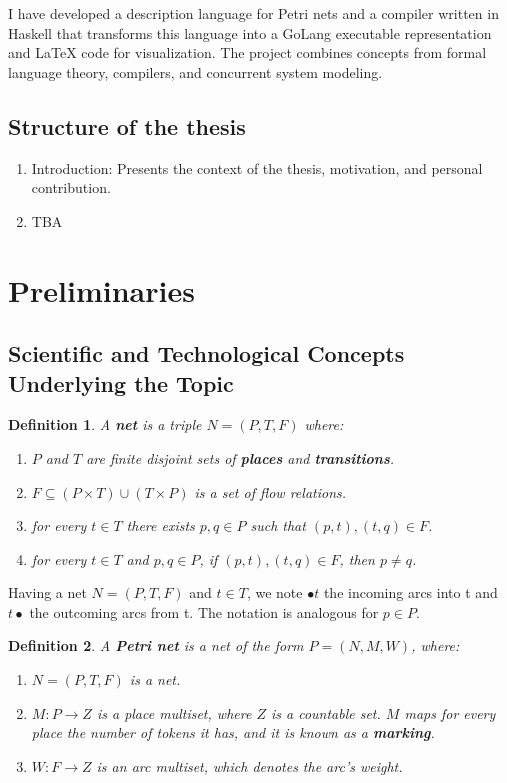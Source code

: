 \documentclass[12pt]{article}
\newtheorem{definition}{Definition}
\begin{document}
    I have developed a description language for Petri nets and a compiler written in Haskell 
    that transforms this language into a GoLang executable representation and LaTeX code for visualization. 
    The project combines concepts from formal language theory, compilers, 
    and concurrent system modeling.

    \subsection{Structure of the thesis}
    \begin{enumerate}
        \item Introduction: Presents the context of the thesis, motivation, and personal contribution.
        \item TBA
    \end{enumerate}
\section{Preliminaries}
    \subsection{Scientific and Technological Concepts Underlying the Topic}
    \begin{definition}
        A \textbf{net} is a triple \(N=(P,T,F)\) where:
        \begin{enumerate}
            \item \(P\) and \(T\) are finite disjoint sets of \textbf{places} and \textbf{transitions}.
            \item \(F \subseteq (P \times T)\cup(T \times P)\) is a set of flow relations.
            \item for every \(t \in T\) there exists $p,q \in P$ such that $(p,t),(t,q) \in F$.
            \item for every $t \in T$ and $p,q \in P$, if $(p,t),(t,q) \in F$, then $p \neq q$. \cite{rozenberg1996elementary}
        \end{enumerate}
    \end{definition}

    Having a net \(N=(P,T,F)\) and \(t \in T\), we note $\bullet t$ the incoming arcs into t and $t \bullet$ the outcoming arcs from t. The notation is analogous for $p \in P$.

    \begin{definition}
        A \textbf{Petri net} is a net of the form $P=(N,M,W)$, where:
        \begin{enumerate}
            \item $N=(P,T,F)$ is a net.
            \item \(M: P \rightarrow Z\) is a place multiset, where \(Z\) is a countable set. \(M\) maps for every place the number of tokens it has, and it is known as a \textbf{marking}.
            \item \(W: F \rightarrow Z\) is an arc multiset, which denotes the arc's weight. \cite{rozenberg1996elementary}
        \end{enumerate}
    \end{definition}
    
\end{document}
